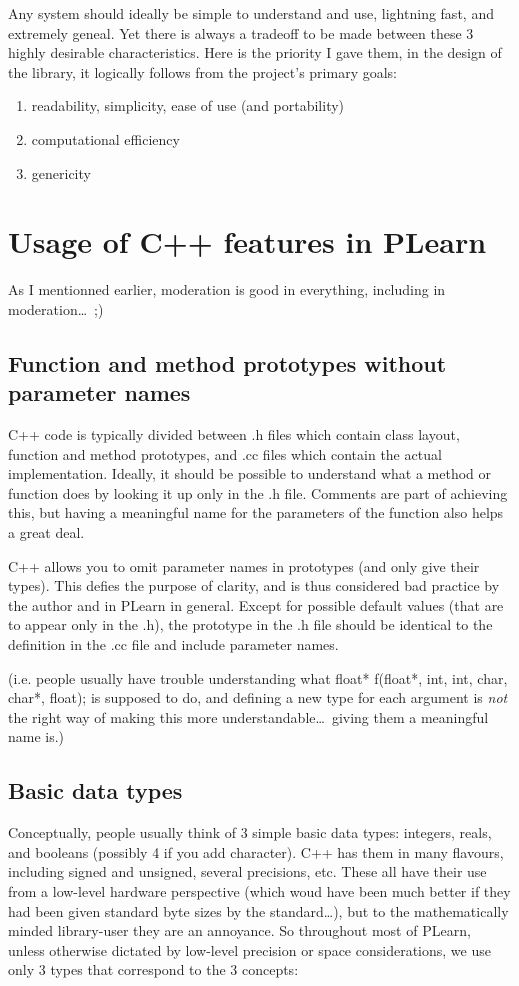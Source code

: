 \documentclass[11pt]{book}
\begin{document}
 Any system should ideally be simple to understand and use, lightning
fast, and extremely geneal. Yet there is always a tradeoff to be made
between these 3 highly desirable characteristics. Here is the priority
I gave them, in the design of the library, it logically follows from
the project's primary goals:

\begin{enumerate}
\item  readability, simplicity, ease of use (and portability)
\item  computational efficiency
\item  genericity
\end{enumerate}

\section{Usage of C++ features in PLearn}

 As I mentionned earlier, moderation is good in everything, including in
 moderation\ldots\ ;) 

\subsection*{Function and method prototypes without parameter names}
 C++ code is typically divided between .h files which contain class
layout, function and method prototypes, and .cc files which contain the
actual implementation. Ideally, it should be possible to understand
what a method or function does by looking it up only in the .h
file. Comments are part of achieving this, but having a meaningful
name for the parameters of the function also helps a great deal.

 C++ allows you to omit parameter names in prototypes (and only
give their types). This defies the purpose of clarity, and is thus
considered bad practice by the author and in PLearn in general. Except
for possible default values (that are to appear only in the .h),
the prototype in the .h file should be identical to the definition
in the .cc file and include parameter names.

 (i.e. people usually have trouble understanding what float* f(float*,
int, int, char, char*, float); is supposed to do, and defining a new
type for each argument is \emph{not} the right way of making this
more understandable\ldots\ giving them a meaningful name is.)

\subsection*{Basic data types}
 Conceptually, people usually think of 3 simple basic data types:
integers, reals, and booleans (possibly 4 if you add character). C++
has them in many flavours, including signed and unsigned, several
precisions, etc. These all have their use from a low-level hardware
perspective (which woud have been much better if they had been given
standard byte sizes by the standard\ldots), but to the mathematically
minded library-user they are an annoyance. So throughout most of
PLearn, unless otherwise dictated by low-level precision or space
considerations, we use only 3 types that correspond to the 3 concepts:
\end{document}
